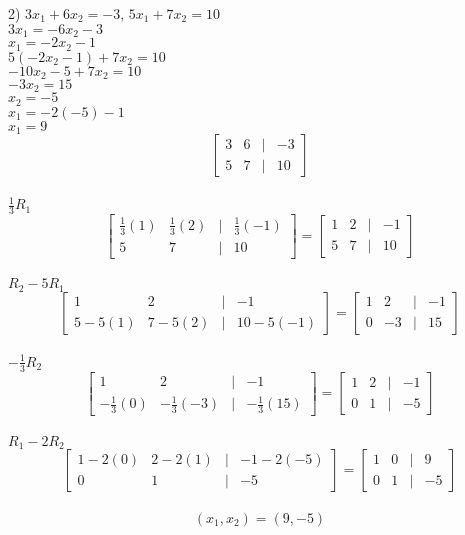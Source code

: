 \documentclass[]{article}
\begin{document}
2) $3x_1 + 6x_2 = -3$, $5x_1 + 7x_2 = 10$\\
$3x_1 = -6x_2 - 3$\\
$x_1 = -2x_2 - 1$\\
$5(-2x_2 - 1) + 7x_2 = 10$\\
$-10x_2 - 5 + 7x_2 = 10$\\
$-3x_2 = 15$\\
$x_2 = -5$\\
$x_1 = -2(-5) - 1$\\
$x_1 = 9$\\
\[
\begin{bmatrix}
	3 & 6 & | & -3 \\
	5 & 7 & | & 10
\end{bmatrix}
\]\\
$\frac{1}{3}R_1$
\[
\begin{bmatrix}
	\frac{1}{3}(1) & \frac{1}{3}(2) &|& \frac{1}{3}(-1)\\
	5&7&|&10
\end{bmatrix}=
\begin{bmatrix}
	1&2&|&-1\\
	5&7&|&10
\end{bmatrix}
\]\\
$R_2-5R_1$
\[
\begin{bmatrix}
	1&2&|&-1\\
	5-5(1)&7-5(2)&|&10-5(-1)
\end{bmatrix}=
\begin{bmatrix}
	1&2&|&-1\\
	0&-3&|&15
\end{bmatrix}
\]\\
$-\frac{1}{3}R_2$
\[
\begin{bmatrix}
	1&2&|&-1\\
	-\frac{1}{3}(0)&-\frac{1}{3}(-3)&|&-\frac{1}{3}(15)
\end{bmatrix}=
\begin{bmatrix}
	1&2&|&-1\\
	0&1&|&-5
\end{bmatrix}
\]\\
$R_1-2R_2$
\[
\begin{bmatrix}
	1-2(0)&2-2(1)&|&-1-2(-5)\\
	0&1&|&-5
\end{bmatrix}=
\begin{bmatrix}
	1&0&|&9\\
	0&1&|&-5
\end{bmatrix}
\]\\
$$(x_1, x_2) = (9,-5)$$\\
\end{document}
